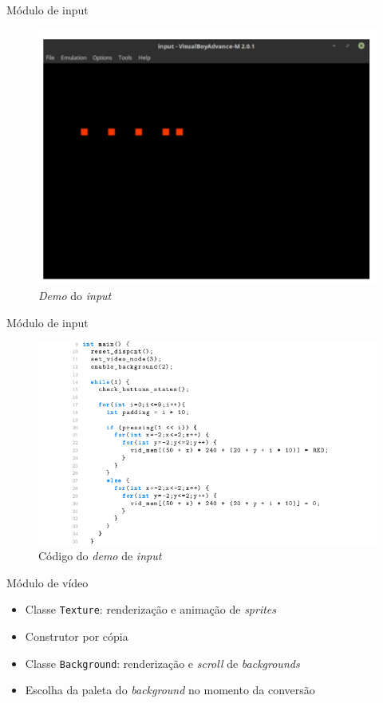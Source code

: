 \documentclass[notes, mathserif]{beamer}
\begin{document}
\begin{frame}{M\'odulo de input}
	\begin{figure}[H]
		\includegraphics[width=.7\linewidth]{figuras/input-demo.png}
		\centering
		\caption{\textit{Demo} do \textit{input}}
		\label{fig:inputdemo}
	\end{figure}
\end{frame}

\begin{frame}{M\'odulo de input}
	\begin{figure}[H]
		\includegraphics[width=.9\linewidth]{figuras/input-demo-codigo.png}
		\centering
		\caption{C\'odigo do \textit{demo} de \textit{input}}
		\label{fig:inputdemocode}
	\end{figure}
\end{frame}

\begin{frame}{M\'odulo de v\'ideo}
	\begin{itemize}[<+->]
		\item Classe \texttt{Texture}: renderiza\c c\~ao e anima\c c\~ao de \textit{sprites}
		\item Construtor por c\'opia
		\item Classe \texttt{Background}: renderiza\c c\~ao e \textit{scroll} de \textit{backgrounds}
		\item Escolha da paleta do \textit{background} no momento da convers\~ao
	\end{itemize}
\end{frame}
\end{document}
